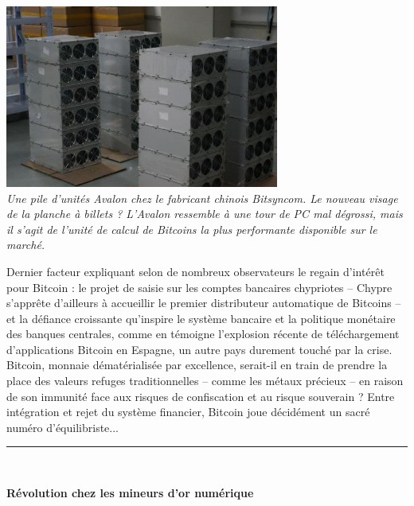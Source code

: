 \documentclass[11pt,twoside,a4paper]{article}
\begin{document}
\begin{minipage}[ht]{9.25cm}
	\includegraphics[width=9.00cm]{img/640-755265.jpg}~\\
	\emph{\small Une pile d'unit{\'e}s Avalon chez le fabricant chinois Bitsyncom. Le nouveau visage de la planche {\`a} billets ? L'Avalon ressemble {\`a} une tour de PC mal d{\'e}grossi, mais il s'agit de l'unit{\'e} de calcul de Bitcoins la plus performante disponible sur le march{\'e}. } ~\\
\end{minipage} \hfill \begin{minipage}[ht]{10.00cm}
	Dernier facteur expliquant selon de nombreux observateurs le regain d'int{\'e}r{\^e}t pour Bitcoin : le projet de saisie sur les comptes bancaires chypriotes -- Chypre s'appr{\^e}te d'ailleurs {\`a} accueillir le premier distributeur automatique de Bitcoins -- et la d{\'e}fiance croissante qu'inspire le syst{\`e}me bancaire et la politique mon{\'e}taire des banques centrales, comme en t{\'e}moigne l'explosion r{\'e}cente de t{\'e}l{\'e}chargement d'applications Bitcoin en Espagne, un autre pays durement touch{\'e} par la crise. ~\\
	
	Bitcoin, monnaie d{\'e}mat{\'e}rialis{\'e}e par excellence, serait-il en train de prendre la place des valeurs refuges traditionnelles -- comme les m{\'e}taux pr{\'e}cieux -- en raison de son immunit{\'e} face aux risques de confiscation et au risque souverain ? Entre int{\'e}gration et rejet du syst{\`e}me financier, Bitcoin joue d{\'e}cid{\'e}ment un sacr{\'e} num{\'e}ro d'{\'e}quilibriste... ~\\
\end{minipage}

\hrule ~\\

\clearpage

\textbf{R{\'e}volution chez les mineurs d'or num{\'e}rique} ~\\
\end{document}
